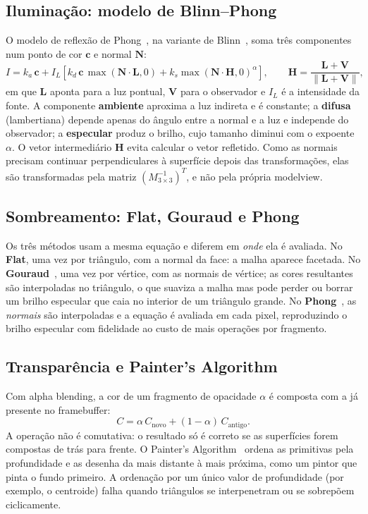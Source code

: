 \documentclass[11pt, a4paper]{article}
\newcommand{\vetor}[1]{\mathbf{#1}}
\begin{document}
\subsection{Iluminação: modelo de Blinn--Phong}
O modelo de reflexão de Phong~\cite{phong1975}, na variante de Blinn~\cite{blinn1977}, soma três componentes num ponto de cor $\vetor{c}$ e normal $\vetor{N}$:
\begin{equation}
  I = k_a\,\vetor{c} + I_L\left[k_d\,\vetor{c}\,\max(\vetor{N}\cdot\vetor{L}, 0) + k_s \max(\vetor{N}\cdot\vetor{H}, 0)^{\alpha}\right],
  \qquad \vetor{H} = \frac{\vetor{L} + \vetor{V}}{\|\vetor{L} + \vetor{V}\|},
\end{equation}
em que $\vetor{L}$ aponta para a luz pontual, $\vetor{V}$ para o observador e $I_L$ é a intensidade da fonte. A componente \textbf{ambiente} aproxima a luz indireta e é constante; a \textbf{difusa} (lambertiana) depende apenas do ângulo entre a normal e a luz e independe do observador; a \textbf{especular} produz o brilho, cujo tamanho diminui com o expoente $\alpha$. O vetor intermediário $\vetor{H}$ evita calcular o vetor refletido. Como as normais precisam continuar perpendiculares à superfície depois das transformações, elas são transformadas pela matriz $(M_{3\times3}^{-1})^T$, e não pela própria modelview.

\subsection{Sombreamento: Flat, Gouraud e Phong}
Os três métodos usam a mesma equação e diferem em \emph{onde} ela é avaliada. No \textbf{Flat}, uma vez por triângulo, com a normal da face: a malha aparece facetada. No \textbf{Gouraud}~\cite{gouraud1971}, uma vez por vértice, com as normais de vértice; as cores resultantes são interpoladas no triângulo, o que suaviza a malha mas pode perder ou borrar um brilho especular que caia no interior de um triângulo grande. No \textbf{Phong}~\cite{phong1975}, as \emph{normais} são interpoladas e a equação é avaliada em cada pixel, reproduzindo o brilho especular com fidelidade ao custo de mais operações por fragmento.

\subsection{Transparência e Painter's Algorithm}
Com alpha blending, a cor de um fragmento de opacidade $\alpha$ é composta com a já presente no framebuffer:
\begin{equation}
  C = \alpha\,C_{\text{novo}} + (1 - \alpha)\,C_{\text{antigo}}.
\end{equation}
A operação não é comutativa: o resultado só é correto se as superfícies forem compostas de trás para frente. O Painter's Algorithm~\cite{newell1972} ordena as primitivas pela profundidade e as desenha da mais distante à mais próxima, como um pintor que pinta o fundo primeiro. A ordenação por um único valor de profundidade (por exemplo, o centroide) falha quando triângulos se interpenetram ou se sobrepõem ciclicamente.
\end{document}
